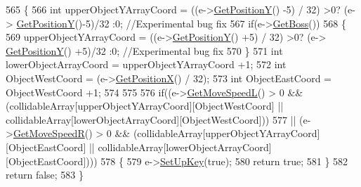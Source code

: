 \begin{DoxyCode}
565 \{
566     \textcolor{keywordtype}{int} upperObjectYArrayCoord = ((e->\hyperlink{classAI_af234b480b8502f3dc1b1f3bac15e8b98}{GetPositionY}() -5) / 32) >0? (e->
      \hyperlink{classAI_af234b480b8502f3dc1b1f3bac15e8b98}{GetPositionY}()-5)/32 :0; \textcolor{comment}{//Experimental bug fix}
567     \textcolor{keywordflow}{if}(e->\hyperlink{classAI_abcffa9942e266731c6993c2040e69f6e}{GetBoss}())
568     \{
569         upperObjectYArrayCoord = ((e->\hyperlink{classAI_af234b480b8502f3dc1b1f3bac15e8b98}{GetPositionY}() +5) / 32) >0? (e->
      \hyperlink{classAI_af234b480b8502f3dc1b1f3bac15e8b98}{GetPositionY}() +5)/32 :0; \textcolor{comment}{//Experimental bug fix}
570     \}
571     \textcolor{keywordtype}{int} lowerObjectArrayCoord = upperObjectYArrayCoord +1;
572     \textcolor{keywordtype}{int} ObjectWestCoord = (e->\hyperlink{classAI_ade2ee4c9c75cdf9f4edd85227193e73d}{GetPositionX}() / 32);
573     \textcolor{keywordtype}{int} ObjectEastCoord = ObjectWestCoord +1;
574 
575 
576     \textcolor{keywordflow}{if}((e->\hyperlink{classAI_a727dd212a4f6dea5030399943b66a285}{GetMoveSpeedL}() > 0 && (collidableArray[upperObjectYArrayCoord][ObjectWestCoord] ||
       collidableArray[lowerObjectArrayCoord][ObjectWestCoord]))
577        || (e->\hyperlink{classAI_af237abb2520be87abb2fc709b23736ec}{GetMoveSpeedR}() > 0 && (collidableArray[upperObjectYArrayCoord][ObjectEastCoord]
       || collidableArray[lowerObjectArrayCoord][ObjectEastCoord])))
578     \{
579         e->\hyperlink{classAI_ab4061283b1ef4cb50b6d7110882c20ab}{SetUpKey}(\textcolor{keyword}{true});
580         \textcolor{keywordflow}{return} \textcolor{keyword}{true};
581     \}
582     \textcolor{keywordflow}{return} \textcolor{keyword}{false};
583 \}
\end{DoxyCode}
